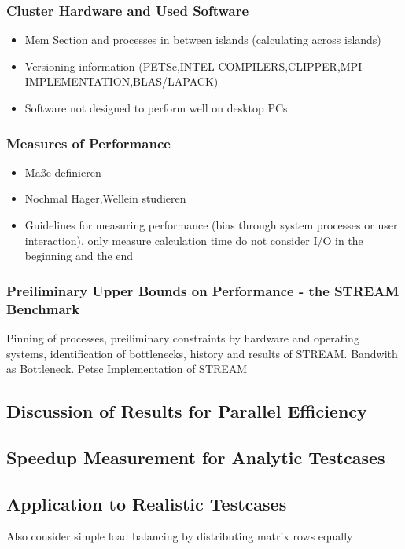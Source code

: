 \documentclass[article,type=msc,colorback,accentcolor=tud2a]{tudthesis}
\begin{document}
      \subsubsection{Cluster Hardware and Used Software}
        \begin{itemize}
          \item Mem Section and processes in between islands (calculating across islands)
          \item Versioning information (PETSc,INTEL COMPILERS,CLIPPER,MPI IMPLEMENTATION,BLAS/LAPACK)
          \item Software not designed to perform well on desktop PCs.
        \end{itemize}

      \subsubsection{Measures of Performance}
        \begin{itemize}
          \item Maße definieren
          \item Nochmal Hager,Wellein studieren
          \item Guidelines for measuring performance (bias through system processes or user interaction), only measure calculation time do not consider I/O in the beginning and the end
        \end{itemize}
      \subsubsection{Preiliminary Upper Bounds on Performance - the STREAM Benchmark}
        Pinning of processes, preiliminary constraints by hardware and operating systems, identification of bottlenecks, history and results of STREAM. Bandwith as Bottleneck. Petsc Implementation of STREAM
      \subsection{Discussion of Results for Parallel Efficiency}
      \subsection{Speedup Measurement for Analytic Testcases}
    \subsection{Application to Realistic Testcases}
      Also consider simple load balancing by distributing matrix rows equally
      
\end{document}
